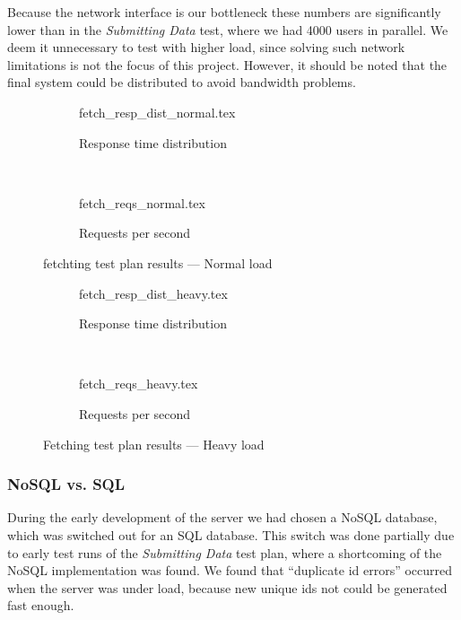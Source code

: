 Because the network interface is our bottleneck these numbers are significantly lower than in the \textit{Submitting Data} test, where we had 4000 users in parallel.
We deem it unnecessary to test with higher load, since solving such network limitations is not the focus of this project.
However, it should be noted that the final system could be distributed to avoid bandwidth problems.

\begin{figure}[!htb]
    \centering
    \begin{subfigure}[b]{\textwidth}
        \footnotesize
        \centering
        {fetch_resp_dist_normal.tex}
        \caption{Response time distribution}\label{fig:fetch_resp_t_dist_normal}
    \end{subfigure}\\
    \begin{subfigure}[b]{\textwidth}
        \footnotesize
        \centering
        {fetch_reqs_normal.tex}
        \caption{Requests per second}\label{fig:fetch_reqs_p_sec_normal}
    \end{subfigure}
    \caption{fetchting test plan results --- Normal load}\label{fig:fetch_test_results_normal}
\end{figure}
\begin{figure}[!htb]
    \begin{subfigure}[b]{\textwidth}
        \footnotesize
        \centering
        {fetch_resp_dist_heavy.tex}
        \caption{Response time distribution}\label{fig:fetch_resp_t_dist_heavy}
    \end{subfigure}\\
    \begin{subfigure}[b]{\textwidth}
        \footnotesize
        \centering
        {fetch_reqs_heavy.tex}
        \caption{Requests per second}\label{fig:fetch_reqs_p_sec_heavy}
    \end{subfigure}
    \caption{Fetching test plan results --- Heavy load}\label{fig:fetch_test_results_heavy}
\end{figure}

\subsubsection*{NoSQL vs. SQL}\label{subsec:nosql_vs._sql}
During the early development of the server we had chosen a NoSQL database, which was switched out for an SQL database.
This switch was done partially due to early test runs of the \textit{Submitting Data} test plan, where a shortcoming of the NoSQL implementation was found.
We found that \enquote{duplicate id errors} occurred when the server was under load, because new unique ids not could be generated fast enough.


